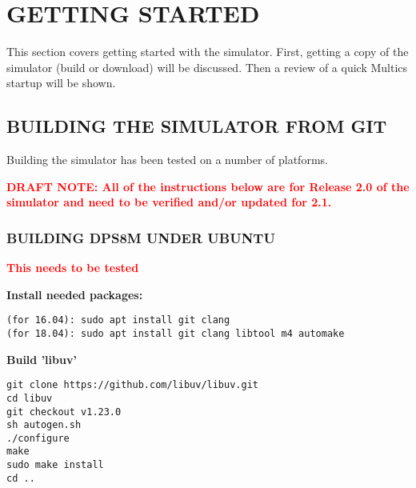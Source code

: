 
\section[Getting Started]{GETTING STARTED}

This section covers getting started with the simulator. First, getting a copy of the simulator (build or download) will be discussed.
Then a review of a quick Multics startup will be shown.

\subsection[Building the Simulator from Git]{BUILDING THE SIMULATOR FROM GIT}

Building the simulator has been tested on a number of platforms.

\textbf{\textcolor{red}{DRAFT NOTE: All of the instructions below are for Release 2.0 of the simulator and need to be verified and/or updated for 2.1.}}

\subsubsection[Building dps8m under Ubuntu]{BUILDING DPS8M UNDER UBUNTU}

\textbf{\textcolor{red}{This needs to be tested}}

\textbf{Install needed packages:}

\begin{adjustwidth}{5ex}{1ex}
	\texttt{(for 16.04):    sudo apt install git clang} \\
    \texttt{(for 18.04):    sudo apt install git clang libtool m4 automake}
\end{adjustwidth}

\textbf{Build 'libuv'}

\begin{adjustwidth}{5ex}{1ex}
    \texttt{git clone https://github.com/libuv/libuv.git} \\
    \texttt{cd libuv} \\
    \texttt{git checkout v1.23.0} \\
    \texttt{sh autogen.sh} \\
    \texttt{./configure} \\
    \texttt{make} \\
    \texttt{sudo make install} \\
    \texttt{cd ..} \\
\end{adjustwidth}

